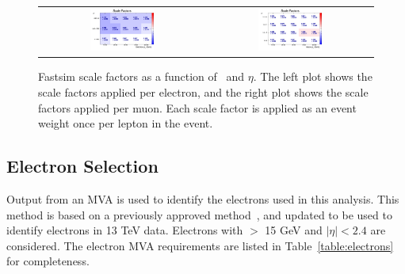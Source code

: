 \begin{figure}[!ht]
  \begin{center}
    \begin{tabular}{cc}
      \includegraphics[width=0.4\textwidth]{evtsel/figs/FS_sf_el_tight_mini01.pdf}  &
      \includegraphics[width=0.4\textwidth]{evtsel/figs/FS_sf_mu_mediumID_mini02.pdf}  \\
    \end{tabular}
    \caption{
      \label{fig:FS_sfs}
      Fastsim scale factors as a function of \pt\ and $\eta$.
      The left plot shows the scale factors applied per electron,
      and the right plot shows the scale factors applied per muon.
      Each scale factor is applied as an event weight once per lepton in the event.
    }
  \end{center}
\end{figure}


\subsection{Electron Selection}
\label{ssec:elsel}
Output from an MVA is used to identify the electrons used in this analysis.
This method is based on a previously approved method~\cite{egamma8tev}, and updated to be used to identify electrons in 13 TeV data.
Electrons with \pt $>$ 15 GeV and $|\eta|<2.4$ are considered.
The electron MVA requirements are listed in Table~\ref{table:electrons} for completeness.

